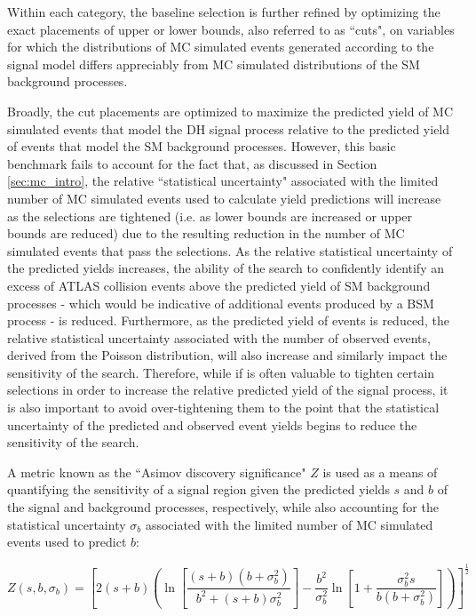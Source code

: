 Within each category, the baseline selection is further refined by optimizing the exact placements of upper or lower bounds, also referred to as ``cuts", on variables for which the distributions of MC simulated events generated according to the signal model differs appreciably from MC simulated distributions of the SM background processes.

Broadly, the cut placements are optimized to maximize the predicted yield of MC simulated events that model the DH signal process relative to the predicted yield of events that model the SM background processes. However, this basic benchmark fails to account for the fact that, as discussed in Section \ref{sec:mc_intro}, the relative ``statistical uncertainty" associated with the limited number of MC simulated events used to calculate yield predictions will increase as the selections are tightened (i.e. as lower bounds are increased or upper bounds are reduced) due to the resulting reduction in the number of MC simulated events that pass the selections. As the relative statistical uncertainty of the predicted yields increases, the ability of the search to confidently identify an excess of ATLAS collision events above the predicted yield of SM background processes - which would be indicative of additional events produced by a BSM process - is reduced. Furthermore, as the predicted yield of events is reduced, the relative statistical uncertainty associated with the number of observed events, derived from the Poisson distribution, will also increase and similarly impact the sensitivity of the search. Therefore, while if is often valuable to tighten certain selections in order to increase the relative predicted yield of the signal process, it is also important to avoid over-tightening them to the point that the statistical uncertainty of the predicted and observed event yields begins to reduce the sensitivity of the search. 

A metric known as the ``Asimov discovery significance" \cite{Buttinger:2643488} \(Z\) is used as a means of quantifying the sensitivity of a signal region given the predicted yields \(s\) and \(b\) of the signal and background processes, respectively, while also accounting for the statistical uncertainty \(\sigma_b\) associated with the limited number of MC simulated events used to predict \(b\):

\begin{equation}
  \label{eq:asimov}
  Z(s, b, \sigma_b) = \left[ 2(s+b)\left(
    \ln\left[ \frac{(s+b)(b+\sigma_b^2)}{b^2 + (s+b)\sigma_b^2} \right]
    - \frac{b^2}{\sigma_b^2}\ln\left[ 1 + \frac{\sigma_b^2 s}{b(b+\sigma_b^2)} \right]
  \right) \right]^\frac{1}{2}
\end{equation}

